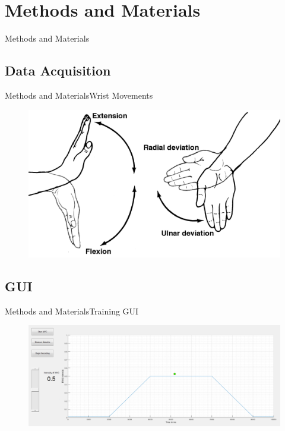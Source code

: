 \documentclass[10pt]{beamer}
\begin{document}


\section{Methods and Materials}
\begin{frame}{Methods and Materials}

\end{frame}


\subsection{Data Acquisition}
\begin{frame}{Methods and Materials}{Wrist Movements}
  \begin{figure}
  		\includegraphics[scale=1]{figures/wrist_move.png}
  \end{figure}
\end{frame}


\subsection{GUI}
\begin{frame}{Methods and Materials}{Training GUI}
 \begin{figure}
 	\includegraphics[scale=0.225]{figures/GUI_training.png}
 \end{figure}
\end{frame}
\end{document}

